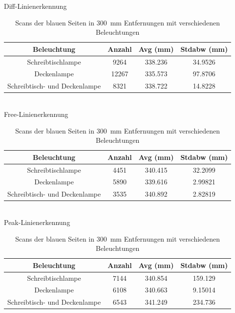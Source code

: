 \documentclass[ngerman,a4paper,parskip=half]{scrartcl}
\begin{document}
\begin{table}[H]
	\centering
	Diff-Linienerkennung \\
	\begin{tabular}{c|c|c|c}
		Beleuchtung & Anzahl & Avg (mm) & Stdabw (mm) \\ \hline
		Schreibtischlampe & 9264 & 338.236 & 34.9526 \\
		Deckenlampe & 12267 & 335.573 & 97.8706 \\
		Schreibtisch- und Deckenlampe & 8321 & 338.722 & 14.8228 \\
	\end{tabular} \\
	\vspace{1em}
	Free-Linienerkennung \\
		\begin{tabular}{c|c|c|c}
		Beleuchtung & Anzahl & Avg (mm) & Stdabw (mm) \\ \hline
		Schreibtischlampe & 4451 & 340.415 & 32.2099 \\
		Deckenlampe & 5890 & 339.616 & 2.99821 \\
		Schreibtisch- und Deckenlampe & 3535 & 340.892 & 2.82819 \\
	\end{tabular} \\
	\vspace{1em}
	Peak-Linienerkennung \\
		\begin{tabular}{c|c|c|c}
		Beleuchtung & Anzahl & Avg (mm) & Stdabw (mm) \\ \hline
		Schreibtischlampe & 7144 & 340.854 & 159.129 \\
		Deckenlampe & 6108 & 340.663 & 9.15014 \\
		Schreibtisch- und Deckenlampe & 6543 & 341.249 & 234.736 \\
	\end{tabular} \\
	\caption{Scans der blauen Seiten in 300~mm Entfernungen mit verschiedenen Beleuchtungen}
	\label{tab:lights}
\end{table}
\end{document}
